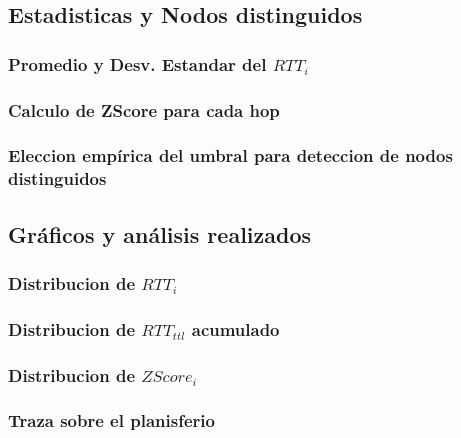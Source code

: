 \subsection{Estadisticas y Nodos distinguidos}
\subsubsection{Promedio y Desv. Estandar del $RTT_i$}
\subsubsection{Calculo de ZScore para cada hop}
\subsubsection{Eleccion emp\'irica del umbral para deteccion de nodos distinguidos}

\subsection{Gr\'aficos y an\'alisis realizados}
\subsubsection{Distribucion de $RTT_i$}
\subsubsection{Distribucion de $RTT_{ttl}$ acumulado}
\subsubsection{Distribucion de $ZScore_i$}
\subsubsection{Traza sobre el planisferio}